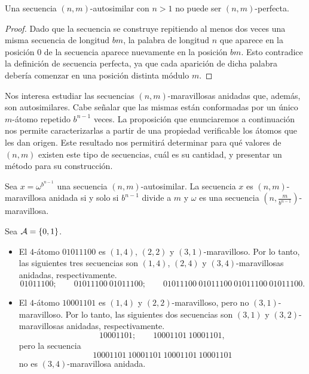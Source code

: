 \begin{proposition} \label{proposition:autosimilar-cannot-be-np}
	Una secuencia $(n,m)$-autosimilar con $n > 1$ no puede ser $(n,m)$-perfecta.
\end{proposition}

\begin{proof}
	Dado que la secuencia se construye repitiendo al menos dos veces una misma
	secuencia de longitud $bm$, la palabra de longitud $n$ que aparece en la
	posición $0$ de la secuencia aparece nuevamente en la posición $bm$.
	Esto contradice la definición de secuencia perfecta, ya que cada aparición de
	dicha palabra debería comenzar en una posición distinta módulo $m$.
\end{proof}

Nos interesa estudiar las secuencias $(n,m)$-maravillosas anidadas que, además,
son autosimilares.
Cabe señalar que las mismas están conformadas por un único $m$-átomo repetido
$b^{n-1}$ veces.
La proposición que enunciaremos a continuación nos permite caracterizarlas a
partir de una propiedad verificable los átomos que les dan origen.
Este resultado nos permitirá determinar para qué valores de $(n,m)$ existen
este tipo de secuencias, cuál es su cantidad, y presentar un método para su
construcción.

\begin{theorem}
	\label{theorem:autosimilar-nm-characterization}
	Sea $x = \omega^{b^{n-1}}$ una secuencia $(n,m)$-autosimilar.
	La secuencia $x$ es $(n,m)$-maravillosa anidada si y solo si $b^{n-1}$
	divide a $m$ y $\omega$
	es una secuencia $\left( n, \frac{m}{b^{n-1}} \right)$-maravillosa.
\end{theorem}

\begin{examples} Sea $\mathcal{A} = \lbrace 0, 1 \rbrace$.
	\begin{itemize}
		\item El $4$-átomo $01011100$ es $(1,4)$, $(2,2)$ y
		      $(3,1)$-maravilloso.
		      Por lo tanto, las siguientes tres secuencias son $(1,4)$, $(2,4)$ y
		      $(3,4)$-maravillosas anidadas, respectivamente.
		      \[ 01011100; \qquad 01011100\ 01011100; \qquad 01011100\
			      01011100\ 01011100\ 01011100.
		      \]
		\item El $4$-átomo $10001101$ es $(1,4)$ y $(2,2)$-maravilloso,
		      pero no $(3,1)$-maravilloso.
		      Por lo tanto, las siguientes dos secuencias son $(3,1)$ y $(3,2)$-maravillosas
		      anidadas, respectivamente.
		      \[ 10001101; \qquad 10001101\ 10001101,
		      \]
		      pero la secuencia
		      \[ 10001101\ 10001101\ 10001101\
			      10001101 \]
		      no es $(3,4)$-maravillosa anidada.
	\end{itemize}
\end{examples}

